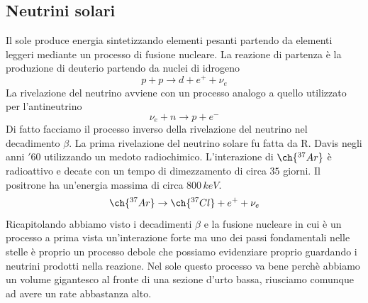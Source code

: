 \subsection{Neutrini solari}
Il sole produce energia sintetizzando elementi pesanti partendo da elementi leggeri mediante un processo di fusione nucleare. La reazione di partenza è la produzione di deuterio partendo da nuclei di idrogeno
\begin{equation*}
    p+p\to d+e^++\nu_e
\end{equation*}
La rivelazione del neutrino avviene con un processo analogo a quello utilizzato per l'antineutrino
\begin{equation*}
    \nu_e+n\to p+e^-
\end{equation*}
Di fatto facciamo il processo inverso della rivelazione del neutrino nel decadimento $\beta$. La prima rivelazione del neutrino solare fu fatta da R. Davis negli anni $'60$ utilizzando un medoto radiochimico. L'interazione di $\ch{^{37}Ar}$ è radioattivo e decate con un tempo di dimezzamento di circa $35$ giorni. Il positrone ha un'energia massima di circa $800\,keV$.
\begin{equation*}
    \ch{^{37}Ar}\to\ch{^{37}Cl}+e^++\nu_e
\end{equation*}
Ricapitolando abbiamo visto i decadimenti $\beta$ e la fusione nucleare in cui è un processo a prima vista un'interazione forte ma uno dei passi fondamentali nelle stelle è proprio un processo debole che possiamo evidenziare proprio guardando i neutrini prodotti nella reazione. Nel sole questo processo va bene perchè abbiamo un volume gigantesco al fronte di una sezione d'urto bassa, riusciamo comunque ad avere un rate abbastanza alto.